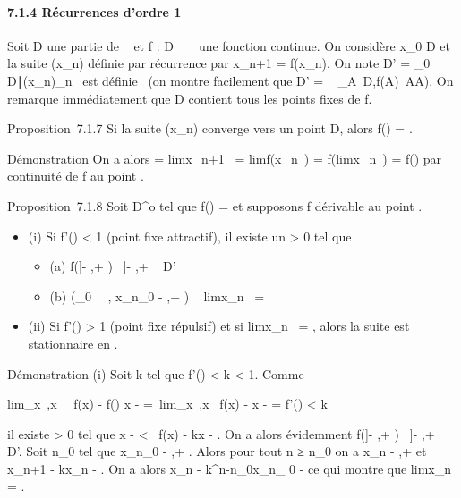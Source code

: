 \documentclass[]{article}
\begin{document}
\paragraph{7.1.4 Récurrences d'ordre 1}

Soit D une partie de ~ et f : D \rightarrow~ ~ une fonction continue. On considère
x_0 \in D et la suite (x_n) définie par récurrence par
x_n+1 = f(x_n). On note D' =
\x_0 \in
D∣(x_n)_n\in{}~\text
est définie \ (on montre facilement que D'
= \⋃ ~
_A\subset~D,f(A)\subset~AA). On remarque immédiatement que D contient tous les
points fixes de f.

Proposition~7.1.7 Si la suite (x_n) converge vers un point \ell \in
D, alors f(\ell) = \ell.

Démonstration On a alors \ell = limx_n+1~
= limf(x_n~) =
f(limx_n~) = f(\ell) par continuité de f
au point \ell.

Proposition~7.1.8 Soit \ell \in D^o tel que f(\ell) = \ell et supposons
f dérivable au point \ell.

\begin{itemize}
\itemsep1pt\parskip0pt
\item
  (i) Si f'(\ell) \textless{} 1 (point fixe attractif),
  il existe un \eta \textgreater{} 0 tel que

  \begin{itemize}
  \itemsep1pt\parskip0pt
  \item
    (a) f({]}\ell - \eta,\ell + \eta{[}) \subset~{]}\ell - \eta,\ell + \eta{[}\subset~ D'
  \item
    (b) \left (\existsn_0~ \in
    ~, x_n_0 \in{]}\ell - \eta,\ell + \eta{[}\right )
    \rigtharrow~ limx_n~ = \ell
  \end{itemize}
\item
  (ii) Si f'(\ell) \textgreater{} 1 (point fixe
  répulsif) et si limx_n~ = \ell, alors
  la suite est stationnaire en \ell.
\end{itemize}

Démonstration (i) Soit k tel que f'(\ell) \textless{} k
\textless{} 1. Comme

lim_x\rightarrow~\ell,x\neq~\ell~\left
 f(x) - f(\ell) \over x - \ell
\right  =\
lim_x\rightarrow~\ell,x\neq~\ell\left
 f(x) - \ell \over x - \ell \right
 = f'(\ell) \textless{} k

il existe \eta \textgreater{} 0 tel que x - \ell
\textless{} \eta \rigtharrow~f(x) - \ell\leq kx - \ell.
On a alors évidemment f({]}\ell - \eta,\ell + \eta{[}) \subset~{]}\ell - \eta,\ell + \eta{[}\subset~ D'. Soit
n_0 tel que x_n_0 \in{]}\ell - \eta,\ell + \eta{[}. Alors
pour tout n ≥ n_0 on a x_n \in{]}\ell - \eta,\ell + \eta{[} et
x_n+1 - \ell\leq kx_n -
\ell. On a alors x_n - \ell\leq
k^n-n_0x_n_ 0 -
\ell ce qui montre que limx_n~
= \ell.
\end{document}
